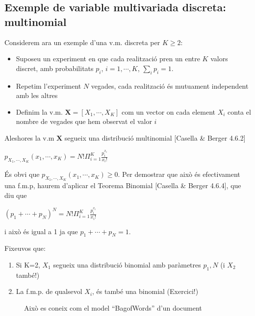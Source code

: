 \documentclass[letterpaper,10pt,english]{sphinxmanual}
\let\sphinxpxdimen\pdfpxdimen\else\newdimen\sphinxpxdimen
\begin{document}
\subsection{Exemple de variable multivariada discreta: multinomial}
\label{\detokenize{0_Intro/0_1_Repas_probabilitat:exemple-de-variable-multivariada-discreta-multinomial}}
Considerem ara un exemple d’una v.m. discreta per \(K \geq 2\):
\begin{itemize}
\item {} 
Suposeu un experiment en que cada realització pren un entre \(K\) valors discret, amb probabilitats \(p_i\), \(i=1,\cdots,K\), \(\sum_i p_i = 1\).

\item {} 
Repetim l’experiment \(N\) vegades, cada realització és mutuament independent amb les altres

\item {} 
Definim la v.m. \(\mathbf{X}=\left[X_1, \cdots, X_K\right]\) com un vector on cada element \(X_i\) conta el nombre de vegades que hem observat el valor \(i\)

\end{itemize}

Aleshores la v.m \(\mathbf{X}\) segueix una distribució multinomial {[}Casella \& Berger 4.6.2{]}

\(p_{X_1, \cdots, X_K}\left(x_1, \cdots, x_K\right) = N!\Pi_{i=1}^{K}\frac{p_i^{x_i}}{x_i!}\)

És obvi que \(p_{X_1, \cdots, X_K}\left(x_1, \cdots, x_K\right)\geq 0\). Per demostrar que això és efectivament una f.m.p,
haurem d’aplicar el Teorema Binomial {[}Casella \& Berger 4.6.4{]}, que diu que

\(\left(p_1 + \cdots + p_N\right)^N = N!\Pi_{i=1}^{K}\frac{p_i^{x_i}}{x_i!}\)

i això és igual a 1 ja que \(p_1 + \cdots + p_N=1\).

Fixeu\sphinxhyphen{}vos que:
\begin{enumerate}
%
\item {} 
Si K=2, \(X_1\) segueix una distribució binomial amb paràmetres \(p_1, N\) (i \(X_2\) també!)

\item {} 
La f.m.p. de qualsevol \(X_i\), és també una binomial (Exercici!)

\end{enumerate}

\begin{figure}[htbp]
\centering
\capstart

\noindent\sphinxincludegraphics[height=500\sphinxpxdimen]{{multinomial_exemple}.png}
\caption{Això es coneix com el model “Bag\sphinxhyphen{}of\sphinxhyphen{}Words” d’un document}\label{\detokenize{0_Intro/0_1_Repas_probabilitat:id6}}\end{figure}
\end{document}
